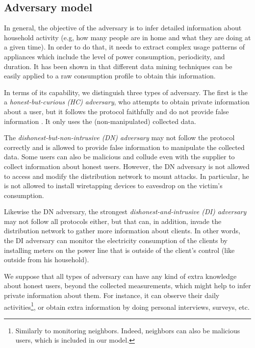 \documentclass[11pt,a4paper]{article}
\theoremstyle{plain}
\theoremstyle{plain}
\theoremstyle{plain}
\theoremstyle{plain}
\theoremstyle{nonumberplain} \theoremseparator{}
\begin{document}
\subsection{Adversary model}
\label{sec:adv_model}

In general, the objective of the adversary is 
to infer detailed information about household
activity (e.g, how many people are in home and 
what they are doing at a given time).
In order to do that, it needs to extract complex usage patterns of appliances which 
include the level of power consumption, periodicity, and duration. 
It has been shown in \cite{Molina10buildsys} that different data mining techniques can be easily 
applied to a raw consumption profile to obtain this information.




In terms of its capability, we distinguish three types of adversary. The first is the 
a \emph{honest-but-curious (HC) adversary}, who attempts to obtain private 
information about a user, but it follows the protocol faithfully and do
not provide false information \cite{Molina10buildsys}. It only uses the (non-manipulated) 
collected data.

The \emph{dishonest-but-non-intrusive (DN) adversary} may not 
follow the protocol correctly and is allowed
to provide false information to manipulate the collected data. 
Some users can also be malicious and collude even 
with the supplier to collect information about honest users. 
However, the DN adversary is not allowed to access and modify the distribution network
to mount attacks. In particular, he is not allowed to install wiretapping devices to eavesdrop on the victim's consumption.

Likewise the DN adversary, the strongest \emph{dishonest-and-intrusive (DI) adversary} may not follow
all protocols either, but that can, in addition, invade the distribution network to gather more information about clients. In other words, the DI adversary can monitor the electricity consumption of the clients by installing meters on the power line that is outside of the client's control (like outside from his household). 

We suppose that all types of adversary can have any kind of extra knowledge about honest users, beyond the collected measurements, which might help to infer private information about them. For instance, it can observe their daily activities\footnote{Similarly to monitoring neighbors. Indeed, neighbors can also be malicious users, which is included in our model.}, or obtain extra information by doing personal interviews, surveys, etc. 
\end{document}

